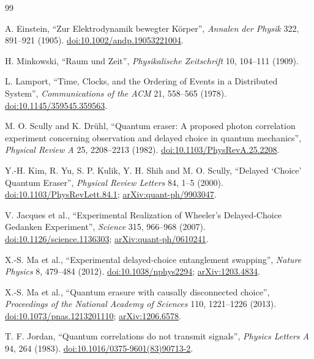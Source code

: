 \documentclass[11pt,a4paper]{article}
\theoremstyle{remark}
\begin{document}
\begin{thebibliography}{99}
\raggedright

A. Einstein,
``Zur Elektrodynamik bewegter Körper'',
\emph{Annalen der Physik} 322, 891--921 (1905).
\href{https://doi.org/10.1002/andp.19053221004}{doi:10.1002/andp.19053221004}.

H. Minkowski,
``Raum und Zeit'',
\emph{Physikalische Zeitschrift} 10, 104--111 (1909).

L. Lamport,
``Time, Clocks, and the Ordering of Events in a Distributed System'',
\emph{Communications of the ACM} 21, 558--565 (1978).
\href{https://doi.org/10.1145/359545.359563}{doi:10.1145/359545.359563}.

M. O. Scully and K. Drühl,
``Quantum eraser: A proposed photon correlation experiment concerning
observation and delayed choice in quantum mechanics'',
\emph{Physical Review A} 25, 2208--2213 (1982).
\href{https://doi.org/10.1103/PhysRevA.25.2208}{doi:10.1103/PhysRevA.25.2208}.

Y.-H. Kim, R. Yu, S. P. Kulik, Y. H. Shih and M. O. Scully,
``Delayed `Choice' Quantum Eraser'',
\emph{Physical Review Letters} 84, 1--5 (2000).
\href{https://doi.org/10.1103/PhysRevLett.84.1}{doi:10.1103/PhysRevLett.84.1};
\href{https://arxiv.org/abs/quant-ph/9903047}{arXiv:quant-ph/9903047}.

V. Jacques et al.,
``Experimental Realization of Wheeler's Delayed-Choice Gedanken Experiment'',
\emph{Science} 315, 966--968 (2007).
\href{https://doi.org/10.1126/science.1136303}{doi:10.1126/science.1136303};
\href{https://arxiv.org/abs/quant-ph/0610241}{arXiv:quant-ph/0610241}.

X.-S. Ma et al.,
``Experimental delayed-choice entanglement swapping'',
\emph{Nature Physics} 8, 479--484 (2012).
\href{https://doi.org/10.1038/nphys2294}{doi:10.1038/nphys2294};
\href{https://arxiv.org/abs/1203.4834}{arXiv:1203.4834}.

X.-S. Ma et al.,
``Quantum erasure with causally disconnected choice'',
\emph{Proceedings of the National Academy of Sciences} 110, 1221--1226
(2013).
\href{https://doi.org/10.1073/pnas.1213201110}{doi:10.1073/pnas.1213201110};
\href{https://arxiv.org/abs/1206.6578}{arXiv:1206.6578}.

T. F. Jordan,
``Quantum correlations do not transmit signals'',
\emph{Physics Letters A} 94, 264 (1983).
\href{https://doi.org/10.1016/0375-9601(83)90713-2}{doi:10.1016/0375-9601(83)90713-2}.


\end{thebibliography}
\end{document}
